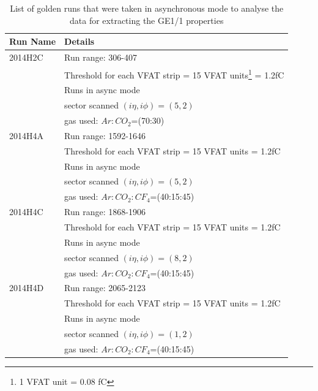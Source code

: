 \begin{table}
\begin{tabular}[!htbp]{l l}
\hline
\textbf{Run Name}   &   \textbf{Details}\\
\hline
2014H2C     & Run range: 306-407    \\
            & Threshold for each VFAT strip = 15 VFAT units\footnote{1 VFAT unit = 0.08 fC} = 1.2fC\\
            & Runs in async mode \\
            & sector scanned $(i\eta, i\phi)=(5,2)$\\
            & gas used: $Ar:CO_{2}$=(70:30)\\
\hline
2014H4A     & Run range: 1592-1646 \\
            & Threshold for each VFAT strip = 15 VFAT units = 1.2fC\\
            & Runs in async mode \\
            & sector scanned $(i\eta, i\phi)=(5,2)$\\
            & gas used: $Ar:CO_{2}:CF_4$=(40:15:45)\\
\hline
2014H4C     & Run range: 1868-1906 \\
            & Threshold for each VFAT strip = 15 VFAT units = 1.2fC\\
            & Runs in async mode \\
            & sector scanned $(i\eta, i\phi)=(8,2)$\\
            & gas used: $Ar:CO_{2}:CF_4$=(40:15:45)\\
\hline
2014H4D     & Run range: 2065-2123 \\
            & Threshold for each VFAT strip = 15 VFAT units = 1.2fC\\
            & Runs in async mode \\
            & sector scanned $(i\eta, i\phi)=(1,2)$\\             
            & gas used: $Ar:CO_{2}:CF_4$=(40:15:45)\\
\hline
\end{tabular}
\caption{List of golden runs that were taken in asynchronous mode to analyse the data for extracting the GE1/1 properties}
\label{tab:gemTBgoldenruns}
\end{table}
